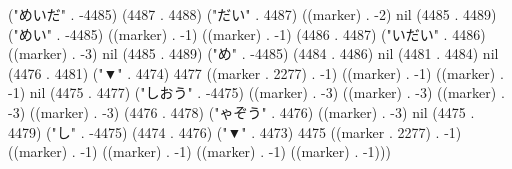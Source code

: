("めいだ" . -4485) (4487 . 4488) ("だい" . 4487) ((marker) . -2) nil (4485 . 4489) ("めい" . -4485) ((marker) . -1) ((marker) . -1) (4486 . 4487) ("いだい" . 4486) ((marker) . -3) nil (4485 . 4489) ("め" . -4485) (4484 . 4486) nil (4481 . 4484) nil (4476 . 4481) ("▼" . 4474) 4477 ((marker . 2277) . -1) ((marker) . -1) ((marker) . -1) nil (4475 . 4477) ("しおう" . -4475) ((marker) . -3) ((marker) . -3) ((marker) . -3) ((marker) . -3) (4476 . 4478) ("ゃぞう" . 4476) ((marker) . -3) nil (4475 . 4479) ("し" . -4475) (4474 . 4476) ("▼" . 4473) 4475 ((marker . 2277) . -1) ((marker) . -1) ((marker) . -1) ((marker) . -1) ((marker) . -1)))
